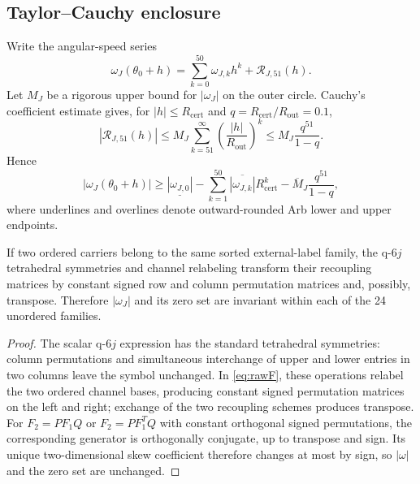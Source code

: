 \subsection{Taylor--Cauchy enclosure}
Write the angular-speed series
\begin{equation}
\omega_J(\theta_0+h)=\sum_{k=0}^{50}\omega_{J,k}h^k+\mathcal R_{J,51}(h).
\label{eq:omegatrunc}
\end{equation}
Let $M_J$ be a rigorous upper bound for $|\omega_J|$ on the outer circle.  Cauchy's coefficient estimate gives, for $|h|\le R_{\mathrm{cert}}$ and $q=R_{\mathrm{cert}}/R_{\mathrm{out}}=0.1$,
\begin{equation}
|\mathcal R_{J,51}(h)|
\le M_J\sum_{k=51}^{\infty}\left(\frac{|h|}{R_{\mathrm{out}}}\right)^k
\le M_J\frac{q^{51}}{1-q}.
\label{eq:cauchytail}
\end{equation}
Hence
\begin{equation}
|\omega_J(\theta_0+h)|
\ge
\underline{|\omega_{J,0}|}
-\sum_{k=1}^{50}\overline{|\omega_{J,k}|}R_{\mathrm{cert}}^k
-\overline M_J\frac{q^{51}}{1-q},
\label{eq:lowerenvelope}
\end{equation}
where underlines and overlines denote outward-rounded Arb lower and upper endpoints.

\begin{proposition}
\label{prop:symmetry}
If two ordered carriers belong to the same sorted external-label family, the q-$6j$ tetrahedral symmetries and channel relabeling transform their recoupling matrices by constant signed row and column permutation matrices and, possibly, transpose.  Therefore $|\omega_J|$ and its zero set are invariant within each of the 24 unordered families.
\end{proposition}

\begin{proof}
The scalar q-$6j$ expression has the standard tetrahedral symmetries: column permutations and simultaneous interchange of upper and lower entries in two columns leave the symbol unchanged.  In \eqref{eq:rawF}, these operations relabel the two ordered channel bases, producing constant signed permutation matrices on the left and right; exchange of the two recoupling schemes produces transpose.  For $F_2=P F_1 Q$ or $F_2=P F_1^TQ$ with constant orthogonal signed permutations, the corresponding generator is orthogonally conjugate, up to transpose and sign.  Its unique two-dimensional skew coefficient therefore changes at most by sign, so $|\omega|$ and the zero set are unchanged.
\end{proof}

